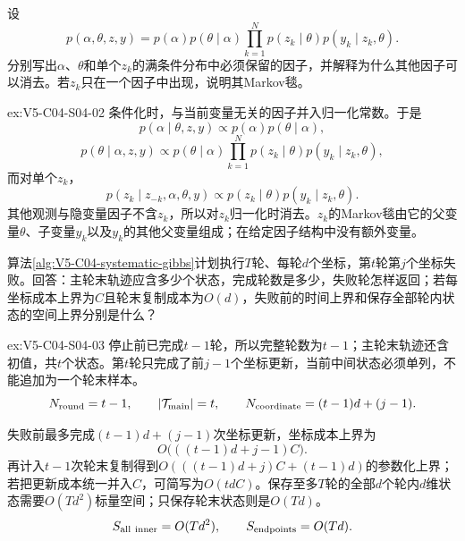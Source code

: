 \begin{SLChapterExercisePairSection}
\begin{exercise}\label{ex:V5-C04-S04-02}
设
\[
p(\alpha,\theta,z,y)
=p(\alpha)p(\theta\mid\alpha)
\prod_{k=1}^N p(z_k\mid\theta)p(y_k\mid z_k,\theta).
\]
分别写出$\alpha$、$\theta$和单个$z_k$的满条件分布中必须保留的因子，并解释为什么其他因子可以消去。若$z_k$只在一个因子中出现，说明其Markov毯。
\end{exercise}
\ifSLFullEdition
{}\label{sol:V5-C04-S04-02}
\begin{chapterexercisesolution}{ex:V5-C04-S04-02}
条件化时，与当前变量无关的因子并入归一化常数。于是
\[
p(\alpha\mid\theta,z,y)
\propto p(\alpha)p(\theta\mid\alpha),
\]
\[
p(\theta\mid\alpha,z,y)
\propto p(\theta\mid\alpha)
\prod_{k=1}^N p(z_k\mid\theta)p(y_k\mid z_k,\theta),
\]
而对单个$z_k$，
\[
p(z_k\mid z_{-k},\alpha,\theta,y)
\propto p(z_k\mid\theta)p(y_k\mid z_k,\theta).
\]
其他观测与隐变量因子不含$z_k$，所以对$z_k$归一化时消去。$z_k$的Markov毯由它的父变量$\theta$、子变量$y_k$以及$y_k$的其他父变量组成；在给定因子结构中没有额外变量。
\end{chapterexercisesolution}
\fi

\begin{exercise}\label{ex:V5-C04-S04-03}
算法\ref{alg:V5-C04-systematic-gibbs}计划执行$T$轮、每轮$d$个坐标，第$t$轮第$j$个坐标失败。回答：主轮末轨迹应含多少个状态，完成轮数是多少，失败轮怎样返回；若每坐标成本上界为$C$且轮末复制成本为$O(d)$，失败前的时间上界和保存全部轮内状态的空间上界分别是什么？
\end{exercise}
\ifSLFullEdition
{}\label{sol:V5-C04-S04-03}
\begin{chapterexercisesolution}{ex:V5-C04-S04-03}
停止前已完成$t-1$轮，所以完整轮数为$t-1$；主轮末轨迹还含初值，共$t$个状态。第$t$轮只完成了前$j-1$个坐标更新，当前中间状态必须单列，不能追加为一个轮末样本。
\[
N_{\rm round}=t-1,\qquad
|\mathcal T_{\rm main}|=t,\qquad
N_{\rm coordinate}=(t-1)d+(j-1).
\]

失败前最多完成$(t-1)d+(j-1)$次坐标更新，坐标成本上界为
\[
O\bigl(((t-1)d+j-1)C\bigr).
\]
再计入$t-1$次轮末复制得到$O(((t-1)d+j)C+(t-1)d)$的参数化上界；若把更新成本统一并入$C$，可简写为$O(tdC)$。保存至多$T$轮的全部$d$个轮内$d$维状态需要$O(Td^2)$标量空间；只保存轮末状态则是$O(Td)$。
\[
S_{\rm all\ inner}=O(Td^2),\qquad
S_{\rm endpoints}=O(Td).
\]
\end{chapterexercisesolution}
\fi


\end{SLChapterExercisePairSection}

